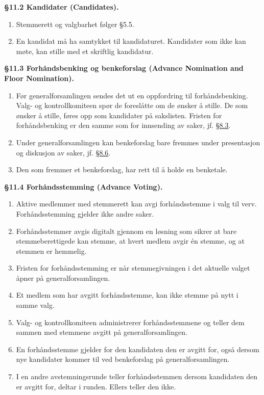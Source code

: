 \documentclass{../../../Common/Latex/Templates/rapport}
\begin{document}
\textbf{\S 11.2 Kandidater (Candidates).}\label{bylaw:11.2}
\begin{enumerate}
  \item Stemmerett og valgbarhet følger \S5.5.
  \item En kandidat må ha samtykket til kandidaturet. Kandidater som ikke kan møte, kan stille med et skriftlig kandidatur.
\end{enumerate}

\textbf{\S 11.3 Forhåndsbenking og benkeforslag (Advance Nomination and Floor Nomination).}\label{bylaw:11.3}
\begin{enumerate}
  \item Før generalforsamlingen sendes det ut en oppfordring til forhåndsbenking. Valg- og kontrollkomiteen spør de foreslåtte om de ønsker å stille. De som ønsker å stille, føres opp som kandidater på sakslisten. Fristen for forhåndsbenking er den samme som for innsending av saker, jf. \hyperref[bylaw:8.3]{\S 8.3}.
  \item Under generalforsamlingen kan benkeforslag bare fremmes under presentasjon og diskusjon av saker, jf. \hyperref[bylaw:8.6]{\S 8.6}.
  \item Den som fremmer et benkeforslag, har rett til å holde en benketale.
\end{enumerate}

\textbf{\S 11.4 Forhåndsstemming (Advance Voting).}\label{bylaw:11.4}
\begin{enumerate}
  \item Aktive medlemmer med stemmerett kan avgi forhåndsstemme i valg til verv. Forhåndsstemming gjelder ikke andre saker.
  \item Forhåndsstemmer avgis digitalt gjennom en løsning som sikrer at bare stemmeberettigede kan stemme, at hvert medlem avgir én stemme, og at stemmen er hemmelig.
  \item Fristen for forhåndsstemming er når stemmegivningen i det aktuelle valget åpner på generalforsamlingen.
  \item Et medlem som har avgitt forhåndsstemme, kan ikke stemme på nytt i samme valg.
  \item Valg- og kontrollkomiteen administrerer forhåndsstemmene og teller dem sammen med stemmene avgitt på generalforsamlingen.
  \item En forhåndsstemme gjelder for den kandidaten den er avgitt for, også dersom nye kandidater kommer til ved benkeforslag på generalforsamlingen.
  \item I en andre avstemningsrunde teller forhåndsstemmen dersom kandidaten den er avgitt for, deltar i runden. Ellers teller den ikke.
\end{enumerate}
\end{document}
